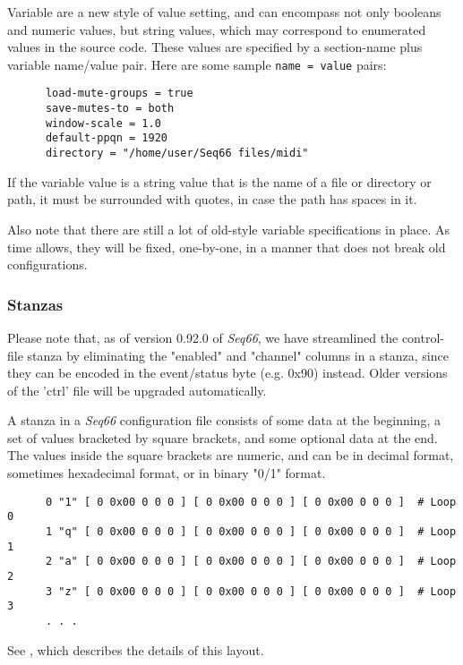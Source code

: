    Variable are a new style of value setting, and can encompass not only
   booleans and numeric values, but string values, which may correspond to
   enumerated values in the source code.  These values are specified by a
   section-name plus variable name/value pair.  Here are some sample
   \texttt{name = value} pairs:

   \begin{verbatim}
      load-mute-groups = true
      save-mutes-to = both
      window-scale = 1.0
      default-ppqn = 1920
      directory = "/home/user/Seq66 files/midi"
   \end{verbatim}

   If the variable value is a string value that is the name of a file or
   directory or path, it must be surrounded with quotes, in case the path has
   spaces in it.

   Also note that there are still a lot of old-style variable specifications in
   place.  As time allows, they will be fixed, one-by-one, in a manner that
   does not break old configurations.

\subsubsection{Stanzas}
\label{subsec:configuration_common_stanzas}

   Please note that, as of version 0.92.0 of \textsl{Seq66}, we have
   streamlined the control-file stanza by eliminating the "enabled" and
   "channel" columns in a stanza, since they can be encoded in the event/status
   byte (e.g. 0x90) instead.  Older versions of the 'ctrl' file will be
   upgraded automatically.

   A stanza in a \textsl{Seq66} configuration file consists of some data at the
   beginning, a set of values bracketed by square brackets, and some optional
   data at the end.  The values inside the square brackets are numeric, and can
   be in decimal format, sometimes hexadecimal format, or in binary "0/1"
   format.

   \begin{verbatim}
      0 "1" [ 0 0x00 0 0 0 ] [ 0 0x00 0 0 0 ] [ 0 0x00 0 0 0 ]  # Loop 0
      1 "q" [ 0 0x00 0 0 0 ] [ 0 0x00 0 0 0 ] [ 0 0x00 0 0 0 ]  # Loop 1
      2 "a" [ 0 0x00 0 0 0 ] [ 0 0x00 0 0 0 ] [ 0 0x00 0 0 0 ]  # Loop 2
      3 "z" [ 0 0x00 0 0 0 ] [ 0 0x00 0 0 0 ] [ 0 0x00 0 0 0 ]  # Loop 3
      . . .
   \end{verbatim}

   See , which describes
   the details of this layout.

